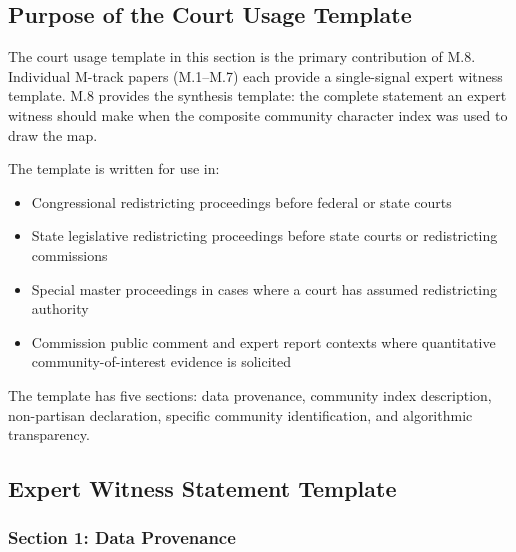 \label{sec:results}

\subsection{Purpose of the Court Usage Template}

The court usage template in this section is the primary contribution of M.8.
Individual M-track papers (M.1--M.7) each provide a single-signal expert
witness template.
M.8 provides the synthesis template: the complete statement an expert witness
should make when the composite community character index was used to draw
the map.

The template is written for use in:
\begin{itemize}
  \item Congressional redistricting proceedings before federal or state courts
  \item State legislative redistricting proceedings before state courts or
    redistricting commissions
  \item Special master proceedings in cases where a court has assumed
    redistricting authority
  \item Commission public comment and expert report contexts where quantitative
    community-of-interest evidence is solicited
\end{itemize}

The template has five sections: data provenance, community index description,
non-partisan declaration, specific community identification, and algorithmic
transparency.

\subsection{Expert Witness Statement Template}

\subsubsection*{Section 1: Data Provenance}

